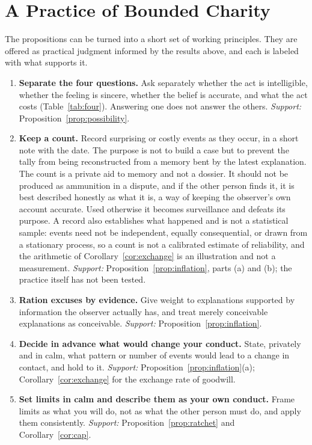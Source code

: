 \documentclass[11pt]{article}
\theoremstyle{definition}
\theoremstyle{remark}
\begin{document}
\section{A Practice of Bounded Charity}\label{sec:practice}

The propositions can be turned into a short set of working principles. They are offered as practical judgment informed by the results above, and each is labeled with what supports it.

\begin{enumerate}[itemsep=0.35em]
\item \textbf{Separate the four questions.} Ask separately whether the act is intelligible, whether the feeling is sincere, whether the belief is accurate, and what the act costs (Table~\ref{tab:four}). Answering one does not answer the others. \emph{Support:} Proposition~\ref{prop:possibility}.
\item \textbf{Keep a count.} Record surprising or costly events as they occur, in a short note with the date. The purpose is not to build a case but to prevent the tally from being reconstructed from a memory bent by the latest explanation. The count is a private aid to memory and not a dossier. It should not be produced as ammunition in a dispute, and if the other person finds it, it is best described honestly as what it is, a way of keeping the observer's own account accurate. Used otherwise it becomes surveillance and defeats its purpose. A record also establishes what happened and is not a statistical sample: events need not be independent, equally consequential, or drawn from a stationary process, so a count is not a calibrated estimate of reliability, and the arithmetic of Corollary~\ref{cor:exchange} is an illustration and not a measurement. \emph{Support:} Proposition~\ref{prop:inflation}, parts (a) and (b); the practice itself has not been tested.
\item \textbf{Ration excuses by evidence.} Give weight to explanations supported by information the observer actually has, and treat merely conceivable explanations as conceivable. \emph{Support:} Proposition~\ref{prop:inflation}.
\item \textbf{Decide in advance what would change your conduct.} State, privately and in calm, what pattern or number of events would lead to a change in contact, and hold to it. \emph{Support:} Proposition~\ref{prop:inflation}(a); Corollary~\ref{cor:exchange} for the exchange rate of goodwill.
\item \textbf{Set limits in calm and describe them as your own conduct.} Frame limits as what you will do, not as what the other person must do, and apply them consistently. \emph{Support:} Proposition~\ref{prop:ratchet} and Corollary~\ref{cor:cap}.

\end{enumerate}
\end{document}
